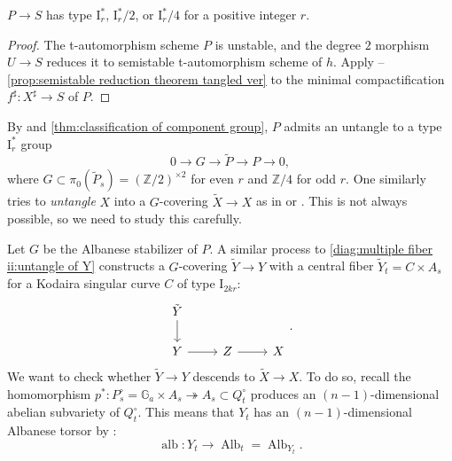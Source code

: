 \documentclass[reqno, letterpaper]{amsart}
\numberwithin{equation}{subsection}
\let\to\longrightarrow
\newcommand{\GG}{\mathbb{G}}
\newcommand{\ZZ}{\mathbb{Z}}
\DeclareMathOperator{\Alb}{Alb}
\DeclareMathOperator{\alb}{alb}
\begin{document}
			\begin{lemma}
				$P \to S$ has type $\mathrm I_r^*$, $\mathrm I_r^*/2$, or $\mathrm I_r^*/4$ for a positive integer $r$.
			\end{lemma}
			\begin{proof}
				The t-automorphism scheme $P$ is unstable, and the degree $2$ morphism $U \to S$ reduces it to semistable t-automorphism scheme of $h$. Apply --\ref{prop:semistable reduction theorem tangled ver} to the minimal compactification $f^\sharp : X^\sharp \to S$ of $P$.
			\end{proof}
			
			By  and \ref{thm:classification of component group}, $P$ admits an untangle to a type $\mathrm I_r^*$ group
			\[ 0 \to G \to \tilde P \to P \to 0 ,\]
			where $G \subset \pi_0(\tilde P_s) = (\ZZ/2)^{\times 2}$ for even $r$ and $\ZZ/4$ for odd $r$. One similarly tries to \emph{untangle} $X$ into a $G$-covering $\tilde X \to X$ as in  or . This is not always possible, so we need to study this carefully.
			
			\medskip
			
			Let $G$ be the Albanese stabilizer of $P$. A similar process to \eqref{diag:multiple fiber ii:untangle of Y} constructs a $G$-covering $\tilde Y \to Y$ with a central fiber $\tilde Y_t = C \times A_s$ for a Kodaira singular curve $C$ of type $\mathrm I_{2kr}$:
			\begin{equation} \label{diag:multiple fiber iv:untangle of Y}
			\begin{tikzcd}
				\tilde Y \arrow[d] \\
				Y \arrow[r] & Z \arrow[r] & X
			\end{tikzcd}.
			\end{equation}
			We want to check whether $\tilde Y \to Y$ descends to $\tilde X \to X$. To do so, recall the homomorphism $p^* : P_s^\circ = \GG_a \times A_s \twoheadrightarrow A_s \subset Q_t^\circ$ produces an $(n-1)$-dimensional abelian subvariety of $Q_t^\circ$. This means that $Y_t$ has an $(n-1)$-dimensional Albanese torsor by :
			\[ \alb : Y_t \to \Alb_t = \Alb_{Y_t} .\]
			
\end{document}
